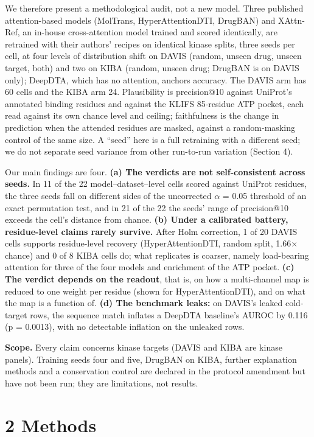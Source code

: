 \documentclass[
  11pt,
]{article}
\begin{document}
We therefore present a methodological audit, not a new model. Three published attention-based models (MolTrans, HyperAttentionDTI, DrugBAN) and XAttn-Ref, an in-house cross-attention model trained and scored identically, are retrained with their authors' recipes on identical kinase splits, three seeds per cell, at four levels of distribution shift on DAVIS (random, unseen drug, unseen target, both) and two on KIBA (random, unseen drug; DrugBAN is on DAVIS only); DeepDTA, which has no attention, anchors accuracy. The DAVIS arm has 60 cells and the KIBA arm 24. Plausibility is precision@10 against UniProt's annotated binding residues and against the KLIFS 85-residue ATP pocket, each read against its own chance level and ceiling; faithfulness is the change in prediction when the attended residues are masked, against a random-masking control of the same size. A ``seed'' here is a full retraining with a different seed; we do not separate seed variance from other run-to-run variation (Section 4).

Our main findings are four. \textbf{(a) The verdicts are not self-consistent across seeds.} In 11 of the 22 model--dataset--level cells scored against UniProt residues, the three seeds fall on different sides of the uncorrected $\alpha$ = 0.05 threshold of an exact permutation test, and in 21 of the 22 the seeds' range of precision@10 exceeds the cell's distance from chance. \textbf{(b) Under a calibrated battery, residue-level claims rarely survive.} After Holm correction, 1 of 20 DAVIS cells supports residue-level recovery (HyperAttentionDTI, random split, 1.66$\times$ chance) and 0 of 8 KIBA cells do; what replicates is coarser, namely load-bearing attention for three of the four models and enrichment of the ATP pocket. \textbf{(c) The verdict depends on the readout}, that is, on how a multi-channel map is reduced to one weight per residue (shown for HyperAttentionDTI), and on what the map is a function of. \textbf{(d) The benchmark leaks:} on DAVIS's leaked cold-target rows, the sequence match inflates a DeepDTA baseline's AUROC by 0.116 (p = 0.0013), with no detectable inflation on the unleaked rows.

\textbf{Scope.} Every claim concerns kinase targets (DAVIS and KIBA are kinase panels). Training seeds four and five, DrugBAN on KIBA, further explanation methods and a conservation control are declared in the protocol amendment but have not been run; they are limitations, not results.

\section{2 Methods}\label{methods}
\end{document}
